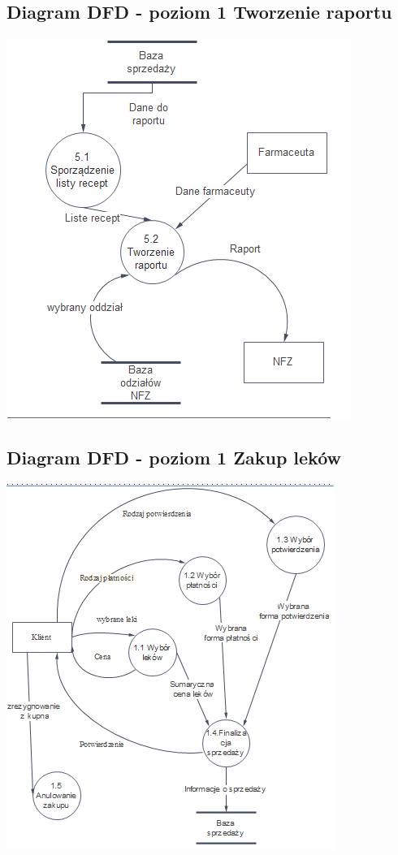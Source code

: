 \documentclass[a4paper, 11pt]{article}
\begin{document}
	\subsection{Diagram DFD - poziom 1 Tworzenie raportu}
		\includegraphics[scale=0.6]{tworzenieRaportu.PNG} 
		
	\subsection{Diagram DFD - poziom 1 Zakup leków}
		\includegraphics[scale=0.6]{zakupLekow2.PNG} 	
\end{document}
